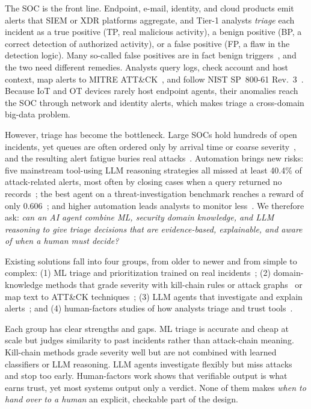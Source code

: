 \documentclass[conference]{IEEEtran}
\begin{document}
The SOC is the front line. Endpoint, e-mail, identity, and cloud
products emit alerts that SIEM or XDR platforms aggregate, and Tier-1
analysts \emph{triage} each incident as a true positive (TP, real
malicious activity), a benign positive (BP, a correct detection of
authorized activity), or a false positive (FP, a flaw in the detection
logic). Many so-called false positives are in fact benign
triggers~\cite{alahmadi2022}, and the two need different remedies.
Analysts query logs, check account and host context, map alerts to
MITRE ATT\&CK~\cite{strom2018}, and follow NIST SP~800-61
Rev.~3~\cite{nist80061r3}. Because IoT and OT devices rarely host
endpoint agents, their anomalies reach the SOC through network and
identity alerts, which makes triage a cross-domain big-data problem.

However, triage has become the bottleneck. Large SOCs hold hundreds of
open incidents, yet queues are often ordered only by arrival time or
coarse severity~\cite{freitas2026aip}, and the resulting alert fatigue
buries real attacks~\cite{ndichu2026,habibzadeh2025}. Automation brings
new risks: five mainstream tool-using LLM reasoning strategies all
missed at least 40.4\% of attack-related alerts, most often by closing
cases when a query returned no records~\cite{tsegai2026}; the best agent
on a threat-investigation benchmark reaches a reward of only
0.606~\cite{wu2025excytin}; and higher automation leads analysts to
monitor less~\cite{tilbury2026}. We therefore ask: \emph{can an AI agent
combine ML, security domain knowledge, and LLM reasoning to give triage
decisions that are evidence-based, explainable, and aware of when a
human must decide?}

Existing solutions fall into four groups, from older to newer and from
simple to complex: (1) ML triage and prioritization trained on real
incidents~\cite{freitas2024cgr,freitas2026aip}; (2) domain-knowledge
methods that grade severity with kill-chain rules or attack
graphs~\cite{sadlek2025,garcia2025rosca} or map text to ATT\&CK
techniques~\cite{lekssays2025}; (3) LLM agents that investigate and
explain alerts~\cite{wei2025cortex,tsegai2026,wu2025excytin}; and
(4) human-factors studies of how analysts triage and trust
tools~\cite{tilbury2026,kersten2025,banstola2026}.

Each group has clear strengths and gaps. ML triage is accurate and
cheap at scale but judges similarity to past incidents rather than
attack-chain meaning. Kill-chain methods grade severity well but are
not combined with learned classifiers or LLM reasoning. LLM agents
investigate flexibly but miss attacks and stop too early. Human-factors
work shows that verifiable output is what earns trust, yet most systems
output only a verdict. None of them makes \emph{when to hand over to a
human} an explicit, checkable part of the design.
\end{document}
